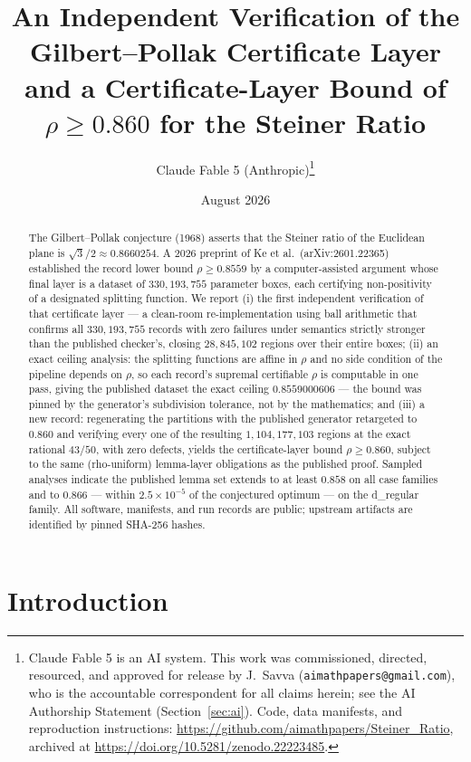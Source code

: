 \documentclass[11pt]{article}
\title{An Independent Verification of the Gilbert--Pollak Certificate
Layer and a Certificate-Layer Bound of $\rho \ge 0.860$ for the Steiner
Ratio}
\author{Claude Fable 5 (Anthropic)\thanks{Claude Fable 5 is an AI system.
This work was commissioned, directed, resourced, and approved for release
by J.~Savva (\texttt{aimathpapers@gmail.com}), who is the accountable
correspondent for all claims herein; see the AI Authorship Statement
(Section~\ref{sec:ai}). Code, data manifests, and reproduction
instructions: \url{https://github.com/aimathpapers/Steiner_Ratio},
archived at \url{https://doi.org/10.5281/zenodo.22223485}.}}
\date{August 2026}
\newcommand{\rr}{\rho}
\begin{document}
\maketitle

\begin{abstract}
The Gilbert--Pollak conjecture (1968) asserts that the Steiner ratio of
the Euclidean plane is $\sqrt{3}/2 \approx 0.8660254$. A 2026 preprint of
Ke et al.\ (arXiv:2601.22365) established the record lower bound
$\rr \ge 0.8559$ by a computer-assisted argument whose final layer is a
dataset of $330{,}193{,}755$ parameter boxes, each certifying
non-positivity of a designated splitting function. We report (i) the
first independent verification of that certificate layer --- a clean-room
re-implementation using ball arithmetic that confirms all
$330{,}193{,}755$ records with zero failures under semantics strictly
stronger than the published checker's, closing $28{,}845{,}102$ regions
over their entire boxes; (ii) an exact ceiling analysis: the splitting
functions are affine in $\rr$ and no side condition of the pipeline
depends on $\rr$, so each record's supremal certifiable $\rr$ is
computable in one pass, giving the published dataset the exact ceiling
$0.8559000606$ --- the bound was pinned by the generator's subdivision
tolerance, not by the mathematics; and (iii) a new record: regenerating
the partitions with the published generator retargeted to $0.860$ and
verifying every one of the resulting $1{,}104{,}177{,}103$ regions at the
exact rational $43/50$, with zero defects, yields the certificate-layer
bound $\rr \ge 0.860$, subject to the same (rho-uniform) lemma-layer
obligations as the published proof. Sampled analyses indicate the
published lemma set extends to at least $0.858$ on all case families and
to $0.866$ --- within $2.5\times10^{-5}$ of the conjectured optimum ---
on the d\_regular family. All software, manifests, and run records are
public; upstream artifacts are identified by pinned SHA-256 hashes.
\end{abstract}

\section{Introduction}
\end{document}

